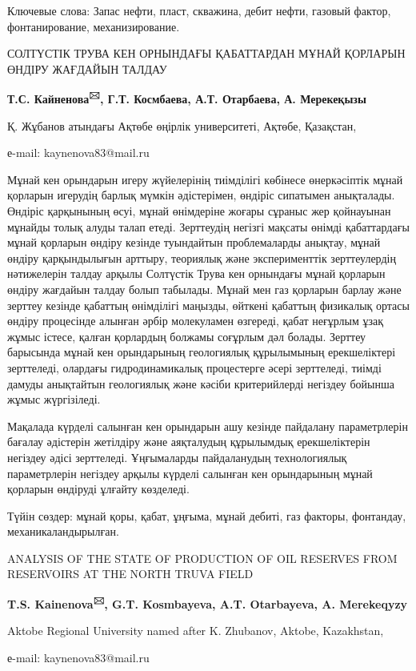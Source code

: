 Ключевые слова: Запас нефти, пласт, скважина, дебит нефти, газовый
фактор, фонтанирование, механизирование.

СОЛТҮСТІК ТРУВА КЕН ОРНЫНДАҒЫ ҚАБАТТАРДАН МҰНАЙ ҚОРЛАРЫН ӨНДІРУ ЖАҒДАЙЫН
ТАЛДАУ

{\bfseries Т.С. Кайненова\textsuperscript{🖂}, Г.Т. Космбаева, А.Т.
Отарбаева, А. Мерекеқызы}

Қ. Жұбанов атындағы Ақтөбе өңірлік университеті, Ақтөбе, Қазақстан,

е-mail: kaynenova83@mail.ru

Мұнай кен орындарын игеру жүйелерінің тиімділігі көбінесе өнеркәсіптік
мұнай қорларын игерудің барлық мүмкін әдістерімен, өндіріс сипатымен
анықталады. Өндіріс қарқынының өсуі, мұнай өнімдеріне жоғары сұраныс жер
қойнауынан мұнайды толық алуды талап етеді. Зерттеудің негізгі мақсаты
өнімді қабаттардағы мұнай қорларын өндіру кезінде туындайтын
проблемаларды анықтау, мұнай өндіру қарқындылығын арттыру, теориялық
және эксперименттік зерттеулердің нәтижелерін талдау арқылы Солтүстік
Трува кен орнындағы мұнай қорларын өндіру жағдайын талдау болып
табылады. Мұнай мен газ қорларын барлау және зерттеу кезінде қабаттың
өнімділігі маңызды, өйткені қабаттың физикалық ортасы өндіру процесінде
алынған әрбір молекуламен өзгереді, қабат неғұрлым ұзақ жұмыс істесе,
қалған қорлардың болжамы соғұрлым дәл болады. Зерттеу барысында мұнай
кен орындарының геологиялық құрылымының ерекшеліктері зерттеледі,
олардағы гидродинамикалық процестерге әсері зерттеледі, тиімді дамуды
анықтайтын геологиялық және кәсіби критерийлерді негіздеу бойынша жұмыс
жүргізіледі.

Мақалада күрделі салынған кен орындарын ашу кезінде пайдалану
параметрлерін бағалау әдістерін жетілдіру және аяқталудың құрылымдық
ерекшеліктерін негіздеу әдісі зерттеледі. Ұңғымаларды пайдаланудың
технологиялық параметрлерін негіздеу арқылы күрделі салынған кен
орындарының мұнай қорларын өндіруді ұлғайту көзделеді.

Түйін сөздер: мұнай қоры, қабат, ұңғыма, мұнай дебиті, газ факторы,
фонтандау, механикаландырылған.

ANALYSIS OF THE STATE OF PRODUCTION OF OIL RESERVES FROM RESERVOIRS AT
THE NORTH TRUVA FIELD

{\bfseries T.S. Kainenova\textsuperscript{🖂}, G.T. Kosmbayeva, A.T.
Otarbayeva, A. Merekeqyzy}

Aktobe Regional University named after K. Zhubanov, Aktobe, Kazakhstan,

е-mail: kaynenova83@mail.ru

